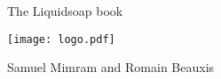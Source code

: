 \documentclass[12pt]{article}
\begin{document}
\pagecolor{Purple!10}

\thispagestyle{empty}
\begin{center}
  \phantom{x}
  \vspace{30mm}

  {\HUGE The Liquidsoap book}

  \vfill

  \texttt{[image: logo.pdf]}

  \vfill

  {\Large Samuel Mimram and Romain Beauxis}

  \vspace{20mm}
\end{center}
\end{document}
